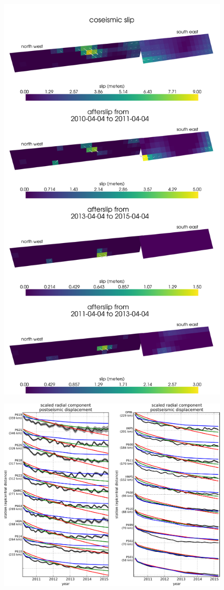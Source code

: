 \documentclass[12pt]{article}
\begin{document}
\begin{figure}
\includegraphics[scale=0.09]{Figures/finalslip}
\centering 
\caption{}
\label{fig:FinalSlip}
\end{figure} 


\begin{figure}
\includegraphics[scale=0.6]{Figures/recordsection2}
\centering 
\caption{}
\label{fig:RecordSection2}
\end{figure} 
\end{document}
